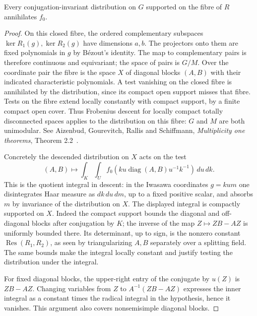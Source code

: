 \begin{lemma}
Every conjugation-invariant distribution on $G$ supported on the fibre of
$R$ annihilates $f_0$.
\end{lemma}
\begin{proof}
On this closed fibre, the ordered complementary subspaces
$\ker R_1(g),\ker R_2(g)$ have dimensions $a,b$. The projectors onto them
are fixed polynomials in $g$ by B\'ezout's identity. The map to complementary
pairs is therefore continuous and equivariant; the space of pairs is
$G/M$. Over the coordinate pair the fibre is the space $X$ of diagonal
blocks $(A,B)$ with their indicated characteristic polynomials. A test
vanishing on the closed fibre is annihilated by the distribution, since
its compact open support misses that fibre. Tests on the fibre extend
locally constantly with compact support, by a finite compact open cover.
Thus Frobenius descent for locally compact totally disconnected spaces
applies to the distribution on this fibre: $G$ and $M$ are both
unimodular. See Aizenbud, Gourevitch, Rallis and Schiffmann,
\emph{Multiplicity one theorems}, Theorem 2.2~\cite{agrs}.

Concretely the descended distribution on $X$ acts on the test
\[
 (A,B)\longmapsto \int_K\int_U
 f_0(k u\operatorname{diag}(A,B)u^{-1}k^{-1})\,du\,dk .
\]
This is the quotient integral in descent: in the Iwasawa coordinates
$g=kum$ one disintegrates Haar measure as $dk\,du\,dm$, up to a fixed
positive scalar, and absorbs $m$ by invariance of the distribution
on $X$. The displayed integral is compactly supported on $X$.
Indeed the compact support bounds the diagonal and off-diagonal blocks
after conjugation by $K$; the inverse of the map $Z\mapsto ZB-AZ$ is
uniformly bounded there. Its determinant, up to sign, is the nonzero
constant $\operatorname{Res}(R_1,R_2)$, as seen by triangularizing
$A,B$ separately over a splitting field. The same bounds make the
integral locally constant and justify testing the distribution under
the integral.

For fixed diagonal blocks, the upper-right entry of the conjugate by
$u(Z)$ is $ZB-AZ$. Changing variables from $Z$ to $A^{-1}(ZB-AZ)$
expresses the inner integral as a constant times the radical integral
in the hypothesis, hence it vanishes. This argument also covers
nonsemisimple diagonal blocks.
\end{proof}
